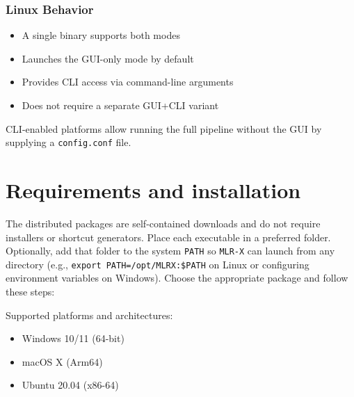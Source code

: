 \documentclass[11pt,a4paper]{article}
\begin{document}
\subsubsection{Linux Behavior}
\begin{itemize}
  \item A single binary supports both modes
  \item Launches the GUI-only mode by default
  \item Provides CLI access via command-line arguments
  \item Does not require a separate GUI+CLI variant
\end{itemize}

\medskip
CLI-enabled platforms allow running the full pipeline without the GUI by supplying a \texttt{config.conf} file.

\section{Requirements and installation}
The distributed packages are self-contained downloads and do not require installers or shortcut generators. Place each executable in a preferred folder. Optionally, add that folder to the system \texttt{PATH} so \verb|MLR-X| can launch from any directory (e.g., \verb|export PATH=/opt/MLRX:$PATH| on Linux or configuring environment variables on Windows). Choose the appropriate package and follow these steps:

Supported platforms and architectures:
\begin{itemize}
  \item Windows 10/11 (64-bit)
  \item macOS X (Arm64)
  \item Ubuntu 20.04 (x86-64)
\end{itemize}
\end{document}

